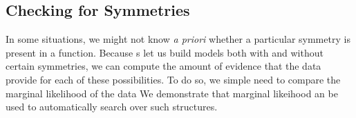 
%








\subsection{Checking for Symmetries}
In some situations, we might not know \emph{a priori} whether a particular symmetry is present in a function.
Because \gp{}s let us build models both with and without certain symmetries, we can compute the amount of evidence that the data provide for each of these possibilities.
To do so, we simple need to compare the marginal likelihood of the data
We demonstrate that marginal likeihood an be used to automatically search over such structures.








